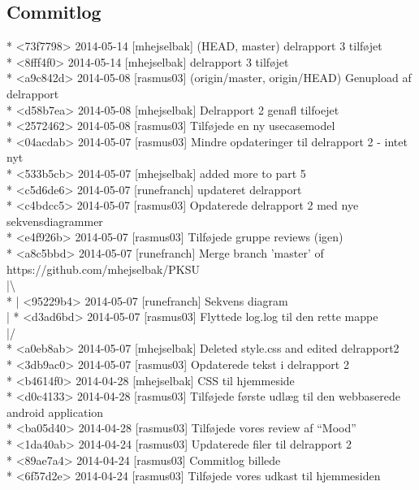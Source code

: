 \documentclass[12pt]{article}
\begin{document}
\subsection*{Commitlog}
* <73f7798> 2014-05-14 [mhejselbak]  (HEAD, master) delrapport 3 tilføjet \\
* <8fff4f0> 2014-05-14 [mhejselbak]  delrapport 3 tilføjet \\
* <a9c842d> 2014-05-08 [rasmus03]  (origin/master, origin/HEAD) Genupload af delrapport \\
* <d58b7ea> 2014-05-08 [mhejselbak]  Delrapport 2 genafl tilfoejet \\
* <2572462> 2014-05-08 [rasmus03]  Tilføjede en ny usecasemodel \\
* <04acdab> 2014-05-07 [rasmus03]  Mindre opdateringer til delrapport 2 - intet nyt \\
* <533b5cb> 2014-05-07 [mhejselbak]  added more to part 5 \\
* <c5d6de6> 2014-05-07 [runefranch]  updateret delrapport \\
* <c4bdcc5> 2014-05-07 [rasmus03]  Opdaterede delrapport 2 med nye sekvensdiagrammer \\
* <e4f926b> 2014-05-07 [rasmus03]  Tilføjede gruppe reviews (igen) \\
*   <a8c5bbd> 2014-05-07 [runefranch]  Merge branch 'master' of https://github.com/mhejselbak/PKSU \\
|\textbackslash   \\
* | <95229b4> 2014-05-07 [runefranch]  Sekvens diagram \\
| * <d3ad6bd> 2014-05-07 [rasmus03]  Flyttede log.log til den rette mappe\\
|/  \\
* <a0eb8ab> 2014-05-07 [mhejselbak]  Deleted style.css and edited delrapport2 \\
* <3db9ac0> 2014-05-07 [rasmus03]  Opdaterede tekst i delrapport 2 \\
* <b4614f0> 2014-04-28 [mhejselbak]  CSS til hjemmeside \\
* <d0c4133> 2014-04-28 [rasmus03]  Tilføjede første udlæg til den webbaserede android application \\
* <ba05d40> 2014-04-28 [rasmus03]  Tilføjede vores review af “Mood” \\
* <1da40ab> 2014-04-24 [rasmus03]  Updaterede filer til delrapport 2 \\
* <89ae7a4> 2014-04-24 [rasmus03]  Commitlog billede \\
* <6f57d2e> 2014-04-24 [rasmus03]  Tilføjede vores udkast til hjemmesiden \\
\end{document}
